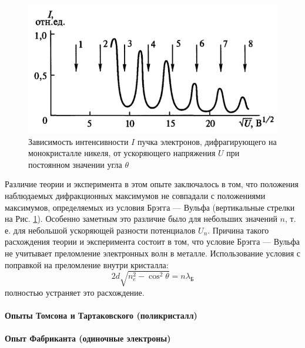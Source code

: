\begin{figure}[H]
	\centering
	\includegraphics[width=0.6\linewidth]{img/oral-05/devison-djermer-intensivnost-u}
	\caption{Зависимость интенсивности $I$ пучка электронов, дифрагирующего на монокристалле никеля, от ускоряющего напряжения $U$ при постоянном значении угла $\theta$}
	\label{fig:devison-djermer-intensivnost-u}
\end{figure}
Различие теории и эксперимента в этом опыте заключалось в том, что положения наблюдаемых дифракционных максимумов не совпадали с положениями максимумов, определяемых из условия Брэгга — Вульфа (вертикальные стрелки на Рис. \ref{fig:devison-djermer-intensivnost-u}). Особенно заметным это различие было для небольших значений $n$, т. е. для небольшой ускоряющей разности потенциалов $U_n$. Причина такого расхождения теории и эксперимента состоит в том, что условие Брэгга — Вульфа не учитывает преломление электронных волн в металле. 
Использование условия с поправкой на преломление внутри кристалла:
\begin{equation*}
	2d\sqrt{n_e^2-\cos^2\theta}=n\lambda_{\text{Б}}
\end{equation*}
полностью устраняет это расхождение.



\newpage
\paragraph{Опыты Томсона и Тартаковского (поликристалл)}

\newpage
\paragraph{Опыт Фабриканта (одиночные электроны)}

